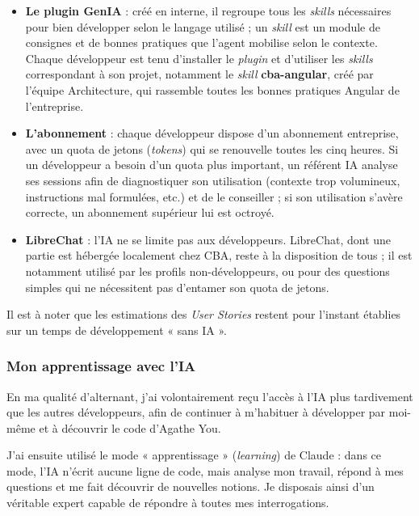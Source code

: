 \documentclass{article}
\begin{document}
\begin{itemize}
    \item \textbf{Le plugin GenIA} : créé en interne, il regroupe tous les \textit{skills} nécessaires pour bien développer selon le langage utilisé ; un \textit{skill} est un module de consignes et de bonnes pratiques que l'agent mobilise selon le contexte. Chaque développeur est tenu d'installer le \textit{plugin} et d'utiliser les \textit{skills} correspondant à son projet, notamment le \textit{skill} \textbf{cba-angular}, créé par l'équipe Architecture, qui rassemble toutes les bonnes pratiques Angular de l'entreprise.

    \item \textbf{L'abonnement} : chaque développeur dispose d'un abonnement entreprise, avec un quota de jetons (\textit{tokens}) qui se renouvelle toutes les cinq heures. Si un développeur a besoin d'un quota plus important, un référent IA analyse ses sessions afin de diagnostiquer son utilisation (contexte trop volumineux, instructions mal formulées, etc.) et de le conseiller ; si son utilisation s'avère correcte, un abonnement supérieur lui est octroyé.

    \item \textbf{LibreChat} : l'IA ne se limite pas aux développeurs. LibreChat, dont une partie est hébergée localement chez CBA, reste à la disposition de tous ; il est notamment utilisé par les profils non-développeurs, ou pour des questions simples qui ne nécessitent pas d'entamer son quota de jetons.
\end{itemize}

Il est à noter que les estimations des \textit{User Stories} restent pour l'instant établies sur un temps de développement « sans IA ».

\subsubsection{Mon apprentissage avec l'IA}

En ma qualité d'alternant, j'ai volontairement reçu l'accès à l'IA plus tardivement que les autres développeurs, afin de continuer à m'habituer à développer par moi-même et à découvrir le code d'Agathe You.

J'ai ensuite utilisé le mode « apprentissage » (\textit{learning}) de Claude : dans ce mode, l'IA n'écrit aucune ligne de code, mais analyse mon travail, répond à mes questions et me fait découvrir de nouvelles notions. Je disposais ainsi d'un véritable expert capable de répondre à toutes mes interrogations.
\end{document}
